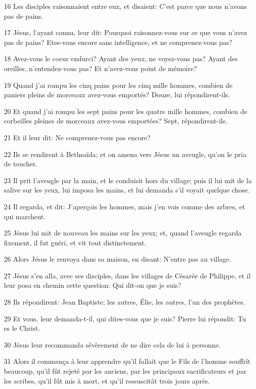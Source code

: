 \par 16 Les disciples raisonnaient entre eux, et disaient: C'est parce que nous n'avons pas de pains.
\par 17 Jésus, l'ayant connu, leur dit: Pourquoi raisonnez-vous sur ce que vous n'avez pas de pains? Etes-vous encore sans intelligence, et ne comprenez-vous pas?
\par 18 Avez-vous le coeur endurci? Ayant des yeux, ne voyez-vous pas? Ayant des oreilles, n'entendez-vous pas? Et n'avez-vous point de mémoire?
\par 19 Quand j'ai rompu les cinq pains pour les cinq mille hommes, combien de paniers pleins de morceaux avez-vous emportés? Douze, lui répondirent-ils.
\par 20 Et quand j'ai rompu les sept pains pour les quatre mille hommes, combien de corbeilles pleines de morceaux avez-vous emportées? Sept, répondirent-ils.
\par 21 Et il leur dit: Ne comprenez-vous pas encore?
\par 22 Ils se rendirent à Bethsaïda; et on amena vers Jésus un aveugle, qu'on le pria de toucher.
\par 23 Il prit l'aveugle par la main, et le conduisit hors du village; puis il lui mit de la salive sur les yeux, lui imposa les mains, et lui demanda s'il voyait quelque chose.
\par 24 Il regarda, et dit: J'aperçois les hommes, mais j'en vois comme des arbres, et qui marchent.
\par 25 Jésus lui mit de nouveau les mains sur les yeux; et, quand l'aveugle regarda fixement, il fut guéri, et vit tout distinctement.
\par 26 Alors Jésus le renvoya dans sa maison, en disant: N'entre pas au village.
\par 27 Jésus s'en alla, avec ses disciples, dans les villages de Césarée de Philippe, et il leur posa en chemin cette question: Qui dit-on que je suis?
\par 28 Ils répondirent: Jean Baptiste; les autres, Élie, les autres, l'un des prophètes.
\par 29 Et vous, leur demanda-t-il, qui dites-vous que je suis? Pierre lui répondit: Tu es le Christ.
\par 30 Jésus leur recommanda sévèrement de ne dire cela de lui à personne.
\par 31 Alors il commença à leur apprendre qu'il fallait que le Fils de l'homme souffrît beaucoup, qu'il fût rejeté par les anciens, par les principaux sacrificateurs et par les scribes, qu'il fût mis à mort, et qu'il ressuscitât trois jours après.
